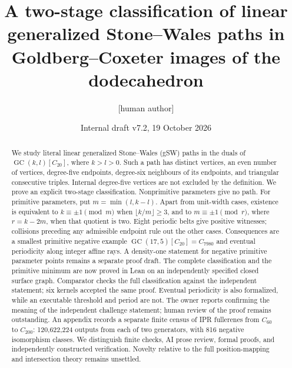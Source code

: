 \documentclass[11pt]{amsart}
\title[Two-stage classification of linear gSW paths]{A two-stage classification of linear generalized Stone--Wales paths in Goldberg--Coxeter images of the dodecahedron}
\author{[human author]}
\date{Internal draft v7.2, 19 October 2026}
\newcommand{\GC}{\operatorname{GC}}
\begin{document}
\begin{abstract}
We study literal linear generalized Stone--Wales (gSW) paths in the duals
of $\GC(k,l)[C_{20}]$, where $k>l>0$. Such a path has distinct vertices,
an even number of vertices, degree-five endpoints, degree-six neighbours
of its endpoints, and triangular consecutive triples. Internal
degree-five vertices are not excluded by the definition. We prove an
explicit two-stage classification. Nonprimitive
parameters give no path. For primitive parameters, put $m=\min(l,k-l)$.
Apart from unit-width cases, existence is equivalent to $k\equiv\pm1
\pmod m$ when $\lfloor k/m\rfloor\ge3$, and to $m\equiv\pm1\pmod r$,
where $r=k-2m$, when that quotient is two. Eight periodic belts give
positive witnesses; collisions preceding any admissible endpoint rule
out the other cases. Consequences are a smallest primitive negative
example $\GC(17,5)[C_{20}]=C_{7980}$ and eventual periodicity along integer
affine rays. A density-one statement for negative primitive parameter
points remains a separate proof draft. The complete classification and the primitive minimum are now
proved in Lean on an independently specified closed surface graph.
Comparator checks the full classification against the independent
statement; six kernels accepted the same proof. Eventual periodicity
is also formalized, while an executable threshold and period are not.
The owner reports confirming the meaning of the independent challenge
statement; human review of the proof remains outstanding. An appendix records a
separate finite census of IPR fullerenes from $C_{60}$ to $C_{200}$:
120,622,224 outputs from each of two generators, with 816 negative
isomorphism classes. We distinguish finite checks, AI prose review,
formal proofs, and independently constructed verification. Novelty
relative to the full position-mapping and intersection theory remains
unsettled.
\end{abstract}
\maketitle
\end{document}
